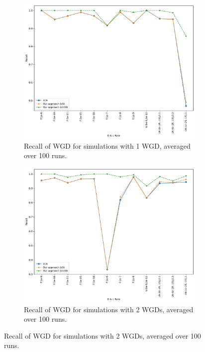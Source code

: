 \documentclass[10pt]{article}
\begin{document}
\begin{figure}[h!]
    \centering
    \begin{subfigure}[b]{0.48\textwidth}
        \centering
        \includegraphics[width=\textwidth]{figs/recall-WGD-t10-t80-Avg.pdf}
        \caption{Recall of WGD for simulations with 1 WGD, averaged over 100 runs.}
        \label{fig:recall-wgd-1wgd}
    \end{subfigure}
    \hfill
    \begin{subfigure}[b]{0.48\textwidth}
        \centering
        \includegraphics[width=\textwidth]{figs/recall-2W-WGD-t20-t80-Avg.pdf}
        \caption{Recall of WGD for simulations with 2 WGDs, averaged over 100 runs.}
        \label{fig:recall-wgd-2wgd}
    \end{subfigure}
    

\end{figure}
\end{document}
